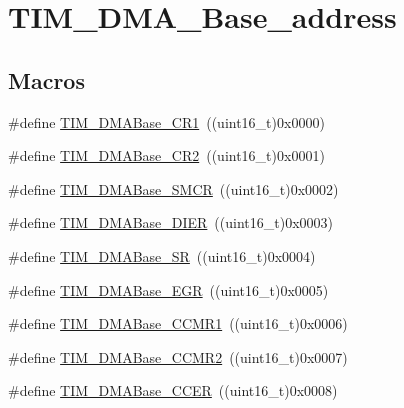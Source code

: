 \hypertarget{group___t_i_m___d_m_a___base__address}{}\section{T\+I\+M\+\_\+\+D\+M\+A\+\_\+\+Base\+\_\+address}
\label{group___t_i_m___d_m_a___base__address}
\subsection*{Macros}
\begin{DoxyCompactItemize}
\item 
\#define \mbox{\hyperlink{group___t_i_m___d_m_a___base__address_ga73bca5b14da2d5026fa3877d0db53740}{T\+I\+M\+\_\+\+D\+M\+A\+Base\+\_\+\+C\+R1}}~((uint16\+\_\+t)0x0000)
\item 
\#define \mbox{\hyperlink{group___t_i_m___d_m_a___base__address_ga50e894f0d2cecc1ff3a3578098c3246e}{T\+I\+M\+\_\+\+D\+M\+A\+Base\+\_\+\+C\+R2}}~((uint16\+\_\+t)0x0001)
\item 
\#define \mbox{\hyperlink{group___t_i_m___d_m_a___base__address_ga748e24ac0675caa55869d6ba506448df}{T\+I\+M\+\_\+\+D\+M\+A\+Base\+\_\+\+S\+M\+CR}}~((uint16\+\_\+t)0x0002)
\item 
\#define \mbox{\hyperlink{group___t_i_m___d_m_a___base__address_gaeddacbbc2adf9705feac250f077d8c93}{T\+I\+M\+\_\+\+D\+M\+A\+Base\+\_\+\+D\+I\+ER}}~((uint16\+\_\+t)0x0003)
\item 
\#define \mbox{\hyperlink{group___t_i_m___d_m_a___base__address_ga5cda07a11a76bbb24a7d5bb680814d31}{T\+I\+M\+\_\+\+D\+M\+A\+Base\+\_\+\+SR}}~((uint16\+\_\+t)0x0004)
\item 
\#define \mbox{\hyperlink{group___t_i_m___d_m_a___base__address_gab5e6f6c3fea100896d13ce317a6ccd8e}{T\+I\+M\+\_\+\+D\+M\+A\+Base\+\_\+\+E\+GR}}~((uint16\+\_\+t)0x0005)
\item 
\#define \mbox{\hyperlink{group___t_i_m___d_m_a___base__address_gaab384496cff3e54d8179fc0db727c7ee}{T\+I\+M\+\_\+\+D\+M\+A\+Base\+\_\+\+C\+C\+M\+R1}}~((uint16\+\_\+t)0x0006)
\item 
\#define \mbox{\hyperlink{group___t_i_m___d_m_a___base__address_ga4989f74592ab359f30bd7c4a4a457571}{T\+I\+M\+\_\+\+D\+M\+A\+Base\+\_\+\+C\+C\+M\+R2}}~((uint16\+\_\+t)0x0007)
\item 
\#define \mbox{\hyperlink{group___t_i_m___d_m_a___base__address_ga6935639db5738662520e8d0eb7116dd6}{T\+I\+M\+\_\+\+D\+M\+A\+Base\+\_\+\+C\+C\+ER}}~((uint16\+\_\+t)0x0008)
\item 

\end{DoxyCompactItemize}
